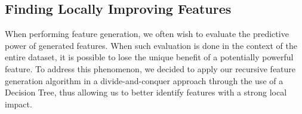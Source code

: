 \documentclass[twoside,11pt]{article}
\theoremstyle{definition}
\begin{document}

\subsection{Finding Locally Improving Features} \label{tree_usage}

When performing feature generation, we often wish to evaluate the predictive power of generated features. When such evaluation is done in the context of the entire dataset, it is possible to lose the unique benefit of a potentially powerful feature. To address this phenomenon, we decided to apply our recursive feature generation algorithm in a divide-and-conquer approach through the use of a Decision Tree, thus allowing us to better identify features with a strong local impact.
\end{document}
